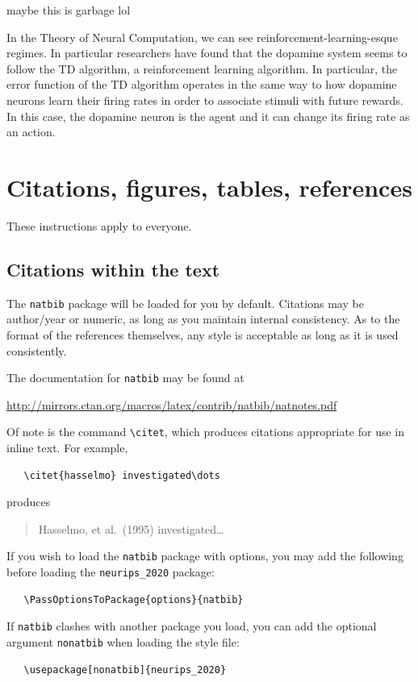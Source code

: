 \documentclass{article}
\begin{document}
maybe this is garbage lol

In the Theory of Neural Computation, we can see reinforcement-learning-esque
regimes. In particular researchers have found that the dopamine system seems
to follow the TD algorithm, a reinforcement learning algorithm. In particular, the error
function of the TD algorithm operates in the same way to how dopamine neurons learn their firing rates in order to 
associate stimuli with future rewards. In this case, the dopamine neuron is the agent
and it can change its firing rate as an action. 





\section{Citations, figures, tables, references}
\label{others}

These instructions apply to everyone.

\subsection{Citations within the text}

The \verb+natbib+ package will be loaded for you by default.  Citations may be
author/year or numeric, as long as you maintain internal consistency.  As to the
format of the references themselves, any style is acceptable as long as it is
used consistently.

The documentation for \verb+natbib+ may be found at
\begin{center}
  \url{http://mirrors.ctan.org/macros/latex/contrib/natbib/natnotes.pdf}
\end{center}
Of note is the command \verb+\citet+, which produces citations appropriate for
use in inline text.  For example,
\begin{verbatim}
   \citet{hasselmo} investigated\dots
\end{verbatim}
produces
\begin{quote}
  Hasselmo, et al.\ (1995) investigated\dots
\end{quote}

If you wish to load the \verb+natbib+ package with options, you may add the
following before loading the \verb+neurips_2020+ package:
\begin{verbatim}
   \PassOptionsToPackage{options}{natbib}
\end{verbatim}

If \verb+natbib+ clashes with another package you load, you can add the optional
argument \verb+nonatbib+ when loading the style file:
\begin{verbatim}
   \usepackage[nonatbib]{neurips_2020}
\end{verbatim}
\end{document}
